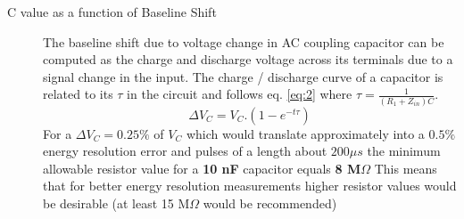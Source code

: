\documentclass[a4paper,11pt]{report}
\begin{document}
\begin{description}
  \item[C value as a function of Baseline Shift]
The baseline shift due to voltage change in AC coupling capacitor can be computed as the charge and discharge voltage across its terminals due to a signal change in the input. The charge / discharge curve of a capacitor is related to its $\tau$ in the circuit and follows eq. \ref{eq:2} where $\tau=\frac{1}{(R_1+Z_{in})C}$.
\begin{equation}
\Delta V_C=V_C.(1-e^{-t\tau})
\label{eq:2}
\end{equation}
For a $\Delta V_C = 0.25\%$ of $V_C$ which would translate approximately into a $0.5\%$ energy resolution error and pulses of a length about $200\mu s$ the minimum allowable resistor value for a \textbf{10 nF} capacitor equals \textbf{8 M$\Omega $}
This means that for better energy resolution measurements higher resistor values would be desirable (at least 15 M$\Omega $ would be  recommended)
\end{description}
\end{document}

